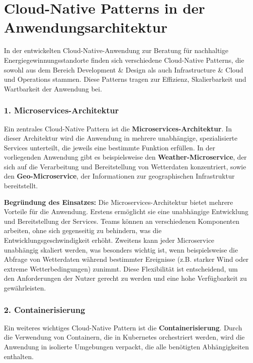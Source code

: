\chapter{Cloud-Native Patterns in der Anwendungsarchitektur}
In der entwickelten Cloud-Native-Anwendung zur Beratung für nachhaltige Energiegewinnungsstandorte finden sich verschiedene Cloud-Native Patterns, die sowohl aus dem Bereich Development & Design als auch Infrastructure & Cloud und Operations stammen. Diese Patterns tragen zur Effizienz, Skalierbarkeit und Wartbarkeit der Anwendung bei.

\subsection{1. Microservices-Architektur}

Ein zentrales Cloud-Native Pattern ist die \textbf{Microservices-Architektur}. In dieser Architektur wird die Anwendung in mehrere unabhängige, spezialisierte Services unterteilt, die jeweils eine bestimmte Funktion erfüllen. In der vorliegenden Anwendung gibt es beispielsweise den \textbf{Weather-Microservice}, der sich auf die Verarbeitung und Bereitstellung von Wetterdaten konzentriert, sowie den \textbf{Geo-Microservice}, der Informationen zur geographischen Infrastruktur bereitstellt.

\textbf{Begründung des Einsatzes:} 
Die Microservices-Architektur bietet mehrere Vorteile für die Anwendung. Erstens ermöglicht sie eine unabhängige Entwicklung und Bereitstellung der Services. Teams können an verschiedenen Komponenten arbeiten, ohne sich gegenseitig zu behindern, was die Entwicklungsgeschwindigkeit erhöht. Zweitens kann jeder Microservice unabhängig skaliert werden, was besonders wichtig ist, wenn beispielsweise die Abfrage von Wetterdaten während bestimmter Ereignisse (z.B. starker Wind oder extreme Wetterbedingungen) zunimmt. Diese Flexibilität ist entscheidend, um den Anforderungen der Nutzer gerecht zu werden und eine hohe Verfügbarkeit zu gewährleisten.

\subsection{2. Containerisierung}

Ein weiteres wichtiges Cloud-Native Pattern ist die \textbf{Containerisierung}. Durch die Verwendung von Containern, die in Kubernetes orchestriert werden, wird die Anwendung in isolierte Umgebungen verpackt, die alle benötigten Abhängigkeiten enthalten.

